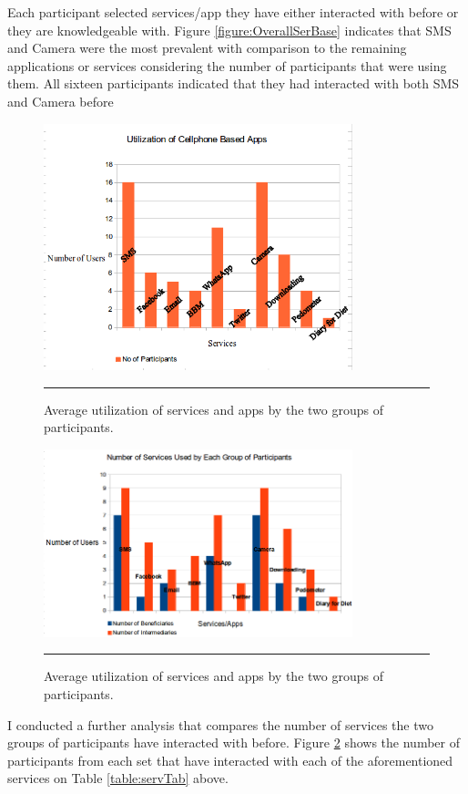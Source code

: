 \newline Each participant selected services/app they have either interacted with before or they are knowledgeable with. Figure \ref{figure:OverallSerBase} indicates that SMS and Camera were the most prevalent with comparison to the remaining applications or services considering the number of participants that were using them. All sixteen participants indicated that they had interacted with both SMS and Camera before
\begin{figure}[htbp]
  \centering
    \includegraphics[width=0.8\textwidth]{Figures/overallcellphoneusebaseline.png}
    \rule{35em}{0.5pt}
  \caption{Average utilization of services and apps by the two groups of participants.}
  \label{figure:OverallServBase}
\end{figure}
\begin{figure}[htbp]
  \centering
    \includegraphics[width=0.8\textwidth]{Figures/baselinepilotallservices.png}
    \rule{35em}{0.5pt}
  \caption{Average utilization of services and apps by the two groups of participants.}
  \label{figure:AllServBase}
\end{figure}
I conducted a further analysis that compares the number of services the two groups of participants have interacted with before. Figure \ref{figure:AllServBase} shows the number of participants from each set that have interacted with each of the aforementioned services on Table \ref{table:servTab} above.
